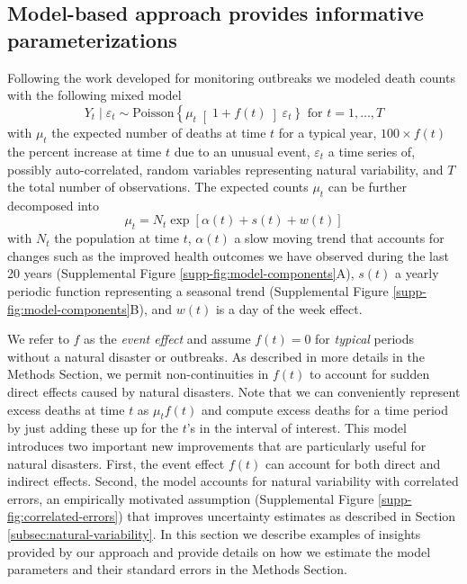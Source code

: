 \documentclass[11pt]{article}
\begin{document}
\subsection{Model-based approach provides informative parameterizations}
\label{subsec:model-based}
Following the work developed for monitoring outbreaks \cite{farrington1996statistical,hohle2008count,noufaily2013improved,salmon2016monitoring} we modeled death counts with the following mixed model
\begin{equation}
    Y_t \mid \varepsilon_t \sim 
    \mbox{Poisson}\left\{ \mu_t \right[1 + f(t) \left]  \varepsilon_t \right\} \mbox{ for } t = 1, \dots,T
\end{equation}
with $\mu_t$ the expected number of deaths at time $t$ for a typical year, $100 \times f(t)$ the percent increase at time $t$  due to an unusual event, $\varepsilon_t$ a time series of, possibly auto-correlated, random variables representing natural variability, and $T$ the total number of observations. The expected counts $\mu_t$ can be further decomposed into 
\begin{equation}
    \mu_t =N_t \exp[\alpha(t) + s(t) + w(t)]
    \label{eq:mean-model}
\end{equation}
with $N_t$ the population at time $t$, $\alpha(t)$ a slow moving trend that accounts for changes such as the improved health outcomes we have observed during the last 20 years (Supplemental Figure \ref{supp-fig:model-components}A), $s(t)$ a yearly periodic function representing a seasonal trend (Supplemental Figure \ref{supp-fig:model-components}B), and $w(t)$ is a day of the week effect. 

We refer to $f$ as the \emph{event effect} and assume $f(t) = 0$ for \emph{typical} periods without a natural disaster or outbreaks.  As described in more details in the Methods Section, we permit non-continuities in $f(t)$ to account for sudden direct effects caused by natural disasters. Note that we can conveniently represent excess deaths at time $t$ as $\mu_t f(t)$ and compute excess deaths for a time period by just adding these up for the $t$'s in the interval of interest. This model introduces two important new improvements that are particularly useful for natural disasters. First, the event effect $f(t)$ can account for both direct and indirect effects. Second, the model accounts for natural variability with correlated errors, an empirically motivated assumption (Supplemental Figure \ref{supp-fig:correlated-errors}) that improves uncertainty estimates as described in Section \ref{subsec:natural-variability}. In this section we describe examples of insights provided by our approach and provide details on how we estimate the model parameters and their standard errors in the Methods Section.
\end{document}
